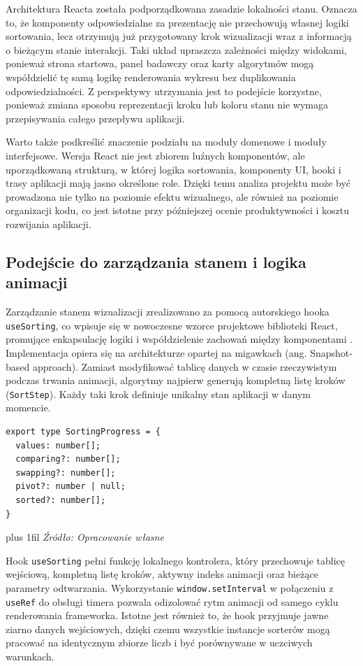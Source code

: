 \documentclass[12pt,openright,twoside]{report}
\newcommand{\source}[1]{{\par\vspace{5pt}\noindent\leftskip=0pt \rightskip=0pt \parfillskip=0pt plus 1fil \footnotesize\textit{Źródło: #1}\par}}
\begin{document}
Architektura Reacta została podporządkowana zasadzie lokalności stanu. Oznacza to, że komponenty odpowiedzialne za prezentację nie przechowują własnej logiki sortowania, lecz otrzymują już przygotowany krok wizualizacji wraz z informacją o bieżącym stanie interakcji. Taki układ upraszcza zależności między widokami, ponieważ strona startowa, panel badawczy oraz karty algorytmów mogą współdzielić tę samą logikę renderowania wykresu bez duplikowania odpowiedzialności. Z perspektywy utrzymania jest to podejście korzystne, ponieważ zmiana sposobu reprezentacji kroku lub koloru stanu nie wymaga przepisywania całego przepływu aplikacji.

Warto także podkreślić znaczenie podziału na moduły domenowe i moduły interfejsowe. Wersja React nie jest zbiorem luźnych komponentów, ale uporządkowaną strukturą, w której logika sortowania, komponenty UI, hooki i trasy aplikacji mają jasno określone role. Dzięki temu analiza projektu może być prowadzona nie tylko na poziomie efektu wizualnego, ale również na poziomie organizacji kodu, co jest istotne przy późniejszej ocenie produktywności i kosztu rozwijania aplikacji.

\subsection{Podejście do zarządzania stanem i logika animacji}
Zarządzanie stanem wizualizacji zrealizowano za pomocą autorskiego hooka \texttt{useSorting}, co wpisuje się w nowoczesne wzorce projektowe biblioteki React, promujące enkapsulację logiki i współdzielenie zachowań między komponentami \cite{Learn_React_Design}. Implementacja opiera się na architekturze opartej na migawkach (ang. Snapshot-based approach). Zamiast modyfikować tablicę danych w czasie rzeczywistym podczas trwania animacji, algorytmy najpierw generują kompletną listę kroków (\texttt{SortStep}). Każdy taki krok definiuje unikalny stan aplikacji w danym momencie.

\begin{lstlisting}[language=tsx, caption={Struktura interfejsu opisująca krok wizualizacji w React.}, label={lst:react-step-interface}]
export type SortingProgress = {
  values: number[];
  comparing?: number[];
  swapping?: number[];
  pivot?: number | null;
  sorted?: number[];
}
\end{lstlisting}
\source{Opracowanie własne}

Hook \texttt{useSorting} pełni funkcję lokalnego kontrolera, który przechowuje tablicę wejściową, kompletną listę kroków, aktywny indeks animacji oraz bieżące parametry odtwarzania. Wykorzystanie \texttt{window.setInterval} w połączeniu z \texttt{useRef} do obsługi timera pozwala odizolować rytm animacji od samego cyklu renderowania frameworka. Istotne jest również to, że hook przyjmuje jawne ziarno danych wejściowych, dzięki czemu wszystkie instancje sorterów mogą pracować na identycznym zbiorze liczb i być porównywane w uczciwych warunkach.
\end{document}
